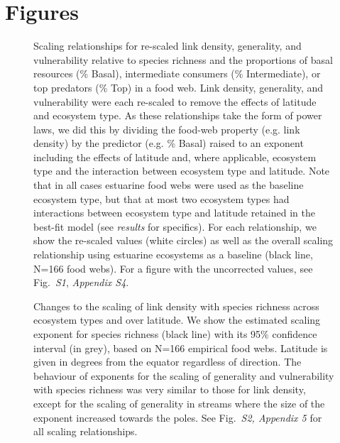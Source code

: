 \documentclass[12pt]{article}
\begin{document}
\newpage

\newpage

\section*{Figures}
\begin{figure}[h]
\caption{Scaling relationships for re-scaled link density, generality, and vulnerability 
relative to species richness and the proportions of basal resources (\% Basal), intermediate 
consumers (\% Intermediate), or top predators (\% Top) in a food web. Link density, generality,
and vulnerability were each re-scaled to remove the effects of latitude and ecosystem
type. As these relationships take the form of power laws, we did this by dividing the food-web
property (e.g. link density) by the predictor (e.g. \% Basal) raised to an exponent including the 
effects of latitude and, where applicable, ecosystem type and the interaction between ecosystem
type and latitude. Note that in all cases estuarine food webs were used as the baseline 
ecosystem type, but that at most two ecosystem types had interactions between ecosystem type and
latitude retained in the best-fit model (see \emph{results} for specifics). For each relationship, 
we show the re-scaled values (white circles) as well as the overall scaling relationship using estuarine
ecosystems as a baseline (black line, N=166 food webs). For a figure with the uncorrected values,
see Fig.~\emph{S1}, \emph{Appendix S4}.}
\label{props_v_lat}
\end{figure}


\begin{figure}[h]
\caption{Changes to the scaling of link density with species richness across ecosystem
types and over latitude. We show the estimated scaling exponent for species richness (black
line) with its 95\% confidence interval (in grey), based on N=166 empirical food webs.
Latitude is given in degrees from the equator regardless of direction. The
behaviour of exponents for the scaling of generality and vulnerability with
species richness was very  similar to those for link density, except for the
scaling of generality in streams where  the size of the exponent increased
towards the poles. See Fig.~\emph{S2, Appendix 5} for  all scaling
relationships.} \label{S} \end{figure}
\end{document}
